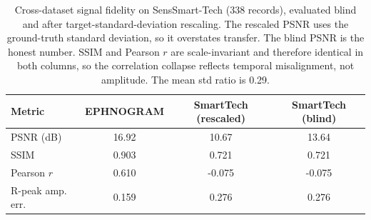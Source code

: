 \begin{table}[!t]
\centering
\caption{Cross-dataset signal fidelity on SensSmart-Tech (338 records), evaluated
blind and after target-standard-deviation rescaling. The rescaled PSNR uses the
ground-truth standard deviation, so it overstates transfer. The blind PSNR is the
honest number. SSIM and Pearson $r$ are scale-invariant and therefore identical in
both columns, so the correlation collapse reflects temporal misalignment, not
amplitude. The mean std ratio is 0.29.}
\label{tab:blind_crossdataset}
\begin{tabular}{@{}lccc@{}}
\toprule
Metric & EPHNOGRAM & SmartTech (rescaled) & SmartTech (blind) \\
\midrule
PSNR (dB)        & 16.92 & 10.67 & 13.64 \\
SSIM             & 0.903 & 0.721 & 0.721 \\
Pearson $r$      & 0.610 & -0.075 & -0.075 \\
R-peak amp. err. & 0.159  & 0.276  & 0.276 \\
\bottomrule
\end{tabular}
\end{table}
